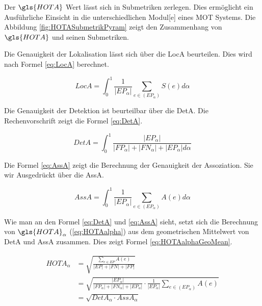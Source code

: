 Der \(\gls{HOTA}\) Wert lässt sich in Submetriken zerlegen. Dies ermöglicht ein Ausführliche Einsicht in die unterschiedlichen \gls{Modul}[e] eines \gls{MOT} Systems. Die Abbildung \ref{fig:HOTASubmetrikPyram} zeigt den Zusammenhang von \(\gls{HOTA}\) und seinen Submetriken. 


Die Genauigkeit der \gls{Lokalisation} lässt sich über die \gls{LocA} beurteilen. Dies wird nach Formel \ref{eq:LocA} berechnet.

\begin{equation}
    \label{eq:LocA}
    LocA = \int_{0}^{1} \frac{1}{|EP_{\alpha}|} \sum_{e \in (EP_{\alpha})} S(e) d\alpha
\end{equation}

Die Genauigkeit der \gls{Detektion} ist beurteilbar über die \gls{DetA}. Die Rechenvorschrift zeigt die Formel \ref{eq:DetA}.

\begin{equation}
    \label{eq:DetA}
    DetA = \int_{0}^{1} \frac{|EP_{\alpha}|}{|FP_{\alpha}| + |FN_{\alpha}| + |EP_{\alpha}| d\alpha}
\end{equation}

Die Formel \ref{eq:AssA} zeigt die Berechnung der Genauigkeit der \gls{Assoziation}. Sie wir Ausgedrückt über die \gls{AssA}. 

\begin{equation}
    \label{eq:AssA}
    AssA = \int_{0}^{1} \frac{1}{|EP_{\alpha}|} \sum_{e \in (EP_{\alpha})} A(e) d\alpha
\end{equation}

Wie man an den Formel \ref{eq:DetA} und \ref{eq:AssA} sieht, setzt sich die Berechnung von \(\gls{HOTA}_{\alpha}\) (\ref{eq:HOTAalpha}) aus dem geometrischen Mittelwert von \gls{DetA} und \gls{AssA} zusammen. Dies zeigt Formel \ref{eq:HOTAalphaGeoMean}.

\begin{equation}
\begin{split}
    \label{eq:HOTAalphaGeoMean}
    HOTA_{\alpha} &= \sqrt{\frac{\sum_{e \in EP} A(e)}{|EP| + |FN| + |FP|}} \\ 
    &= \sqrt{\frac{|EP_{\alpha}|}{|FP_{\alpha}| + |FN_{\alpha}| + |EP_{\alpha}|} \cdot \frac{1}{|EP_{\alpha}|} \sum_{e \in (EP_{\alpha})} A(e)} \\ 
    &= \sqrt{DetA_{\alpha} \cdot AssA_{\alpha}}
\end{split}
\end{equation}

